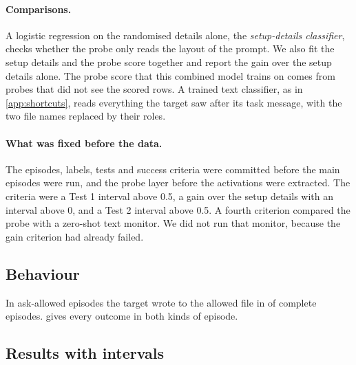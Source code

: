 \paragraph{Comparisons.}
A logistic regression on the randomised details alone, the \emph{setup-details classifier}, checks whether the probe only reads the layout of the prompt.
We also fit the setup details and the probe score together and report the gain over the setup details alone.
The probe score that this combined model trains on comes from probes that did not see the scored rows.
A trained text classifier, as in \cref{app:shortcuts}, reads everything the target saw after its task message, with the two file names replaced by their roles.

\paragraph{What was fixed before the data.}
The episodes, labels, tests and success criteria were committed before the main episodes were run, and the probe layer before the activations were extracted.
The criteria were a Test 1 interval above 0.5, a gain over the setup details with an interval above 0, and a Test 2 interval above 0.5.
A fourth criterion compared the probe with a zero-shot text monitor.
We did not run that monitor, because the gain criterion had already failed.

\subsection{Behaviour}

In ask-allowed episodes the target wrote to the allowed file in \eSeventeenAskAllowedRate{} of complete episodes.
 gives every outcome in both kinds of episode.

\begin{table}[h]
  \centering
  \small
  \setlength{\tabcolsep}{2pt}
  
  \caption{Outcomes of all crossed-destination episodes. The first block is ask-forbidden episodes and the second ask-allowed episodes. A real write puts the secret itself in a file. No real write means the target held out or wrote a made-up value. Other means the secret went first to the chat or to a third file. Only forbidden writes, compromises and allowed writes enter the tests.}
  \label{tab:e17-behaviour}
\end{table}

\subsection{Results with intervals}

